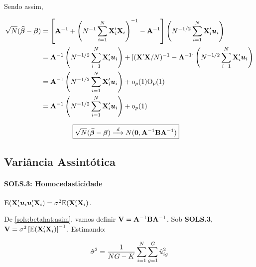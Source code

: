 \documentclass[11pt, oneside, a4paper, article]{article}
\numberwithin{equation}{section}
\begin{document}
\noindent
Sendo assim,

\vspace{-1 em}
\begin{align*} 
	\sqrt{N}(\widehat{\boldsymbol{\beta}} - \boldsymbol{\beta}) &= 
	\left[ 
		\mathbf{A}^{-1} +
		\left( N^{-1} \sum_{i=1}^{N} \mathbf{X}_{i}' \mathbf{X}_{i}   \right)^{-1}
		- \mathbf{A}^{-1}
	\right]
	\left( N^{-1/2} \sum_{i=1}^{N} \mathbf{X}_{i}' \boldsymbol{u}_{i}   \right)
	\\ &=
	\mathbf{A}^{-1}\left( N^{-1/2} \sum_{i=1}^{N} \mathbf{X}_{i}' \boldsymbol{u}_{i}   \right)
	+
	[(\mathbf{X}'\mathbf{X}/N)^{-1} - \mathbf{A}^{-1}]
	\left( N^{-1/2} \sum_{i=1}^{N} \mathbf{X}_{i}' \boldsymbol{u}_{i}   \right)
	\\&=
	\mathbf{A}^{-1}\left( N^{-1/2} \sum_{i=1}^{N} \mathbf{X}_{i}' \boldsymbol{u}_{i}   \right)
	+ \text{o}_{p}(1) \text{O}_{p}(1)
	\\&=
	\mathbf{A}^{-1}\left( N^{-1/2} \sum_{i=1}^{N} \mathbf{X}_{i}' \boldsymbol{u}_{i}   \right)
	+ \text{o}_{p}(1)
\end{align*}

\vspace{-1 em}
\begin{align}\label{sols:betahat:asim}
	\Aboxed{
		\sqrt{N}(\betahatbold - \betavec)
		\arrowd
		N(\zerovec, \Amat^{-1} \Bmat \Amat^{-1})
	}
\end{align}

\subsection{Variância Assintótica}

\paragraph{SOLS.3: Homocedasticidade}
$\text{E}(\mathbf{X}_{i}' \boldsymbol{u}_{i} \boldsymbol{u}_{i}' \mathbf{X}_{i}) = \sigma^{2} \text{E}(\mathbf{X}_{i}' \mathbf{X}_{i})$.

\vspace{1 em} 
De \eqref{sols:betahat:asim}, vamos definir $\mathbf{V} = \mathbf{A}^{-1} \mathbf{B} \mathbf{A}^{-1}$.
Sob \textbf{SOLS.3},
$\mathbf{V} = \sigma^{2} \left[ \text{E}(\mathbf{X}_{i}' \mathbf{X}_{i}) \right]^{-1}$.
Estimando:

\vspace{-1 em}
\begin{align*}
	\hat{\sigma}^{2}
	=
	\frac{1}{NG - K}
	\sum_{i =1}^{N} \sum_{g=1}^{G} \hat{u}^2_{ig}
\end{align*}
\end{document}
